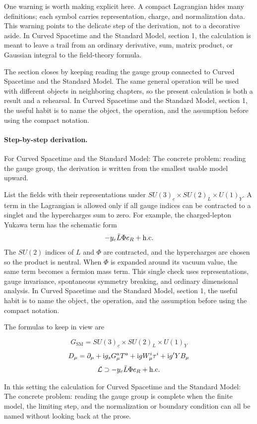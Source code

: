 One warning is worth making explicit here.  A compact Lagrangian hides many definitions; each symbol carries representation, charge, and normalization data.  This warning points to the delicate step of the derivation, not to a decorative aside.  In Curved Spacetime and the Standard Model, section 1, the calculation is meant to leave a trail from an ordinary derivative, sum, matrix product, or Gaussian integral to the field-theory formula.

The section closes by keeping reading the gauge group connected to Curved Spacetime and the Standard Model.  The same general operation will be used with different objects in neighboring chapters, so the present calculation is both a result and a rehearsal.  In Curved Spacetime and the Standard Model, section 1, the useful habit is to name the object, the operation, and the assumption before using the compact notation.



\paragraph{Step-by-step derivation.}

For Curved Spacetime and the Standard Model: The concrete problem: reading the gauge group, the derivation is written from the smallest usable model upward.

List the fields with their representations under \(SU(3)_c\times SU(2)_L\times U(1)_Y\).  A term in the Lagrangian is allowed only if all gauge indices can be contracted to a singlet and the hypercharges sum to zero.  For example, the charged-lepton Yukawa term has the schematic form
\[
  -y_e\bar L\Phi e_R+\hbox{h.c.}
\]
The \(SU(2)\) indices of \(L\) and \(\Phi\) are contracted, and the hypercharges are chosen so the product is neutral.  When \(\Phi\) is expanded around its vacuum value, the same term becomes a fermion mass term.  This single check uses representations, gauge invariance, spontaneous symmetry breaking, and ordinary dimensional analysis.  In Curved Spacetime and the Standard Model, section 1, the useful habit is to name the object, the operation, and the assumption before using the compact notation.

The formulas to keep in view are

\[
  G_{\mathrm{SM}}=SU(3)_c\times SU(2)_L\times U(1)_Y
\]
\[
  D_\mu=\partial_\mu+\mathrm i g_sG_\mu^aT^a+\mathrm i gW_\mu^i\tau^i+\mathrm i g'YB_\mu
\]
\[
  \mathcal L\supset -y_e\bar L\Phi e_R+\hbox{h.c.}
\]

In this setting the calculation for Curved Spacetime and the Standard Model: The concrete problem: reading the gauge group is complete when the finite model, the limiting step, and the normalization or boundary condition can all be named without looking back at the prose.




